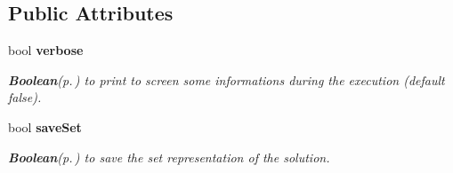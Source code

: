 \subsection*{Public Attributes}
\begin{CompactItemize}
\item 
bool {\bf verbose}\label{class_apriori_de33c80face437efdf4b032849811d07}

\begin{CompactList}\small\item\em {\bf Boolean}{\rm (p.\,\pageref{class_boolean})} to print to screen some informations during the execution (default false). \item\end{CompactList}\item 
bool {\bf save\-Set}\label{class_apriori_7fd142ed119cef31fdcb325709425ab6}

\begin{CompactList}\small\item\em {\bf Boolean}{\rm (p.\,\pageref{class_boolean})} to save the set representation of the solution. \item\end{CompactList}\end{CompactItemize}
